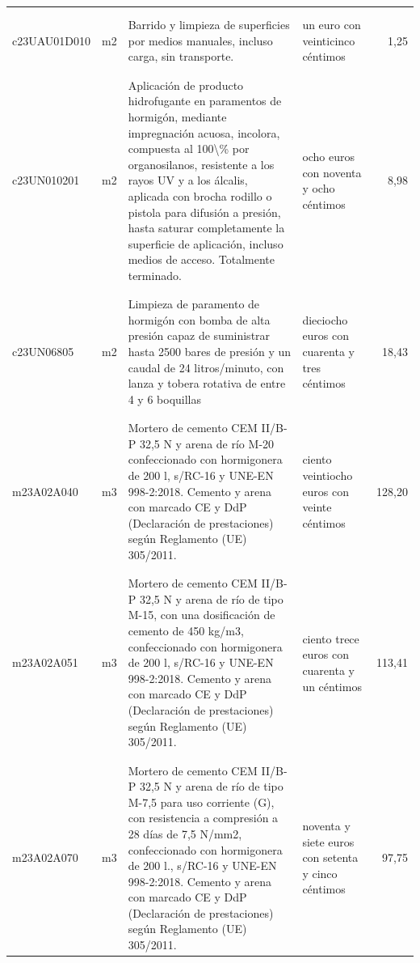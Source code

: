 \documentclass{book}%
\begin{document}
\begin{supertabular}{|l|l|p{5cm}|p{3cm}|r|}
&&&&\\%
&&&&\\%
c23UAU01D010&m2&Barrido y limpieza de superficies por medios manuales, incluso carga, sin transporte.&un euro con veinticinco céntimos&1,25\\%
&&&&\\%
&&&&\\%
c23UN010201&m2&Aplicación de producto hidrofugante en paramentos de hormigón, mediante impregnación acuosa, incolora, compuesta al 100\textbackslash{}\% por organosilanos, resistente a los rayos UV y a los álcalis, aplicada con brocha rodillo o pistola para difusión a presión, hasta saturar completamente la superficie de aplicación, incluso medios de acceso. Totalmente terminado.&ocho euros con noventa y ocho céntimos&8,98\\%
&&&&\\%
&&&&\\%
c23UN06805&m2&Limpieza de paramento de hormigón con bomba de alta presión capaz de suministrar hasta 2500 bares de presión y un caudal de 24 litros/minuto, con lanza y tobera rotativa de entre 4 y 6 boquillas&dieciocho euros con cuarenta y tres céntimos&18,43\\%
&&&&\\%
&&&&\\%
m23A02A040&m3&Mortero de cemento CEM II/B{-}P 32,5 N y arena de río M{-}20 confeccionado con hormigonera de 200 l, s/RC{-}16 y UNE{-}EN 998{-}2:2018. Cemento y arena con marcado CE y DdP (Declaración de prestaciones) según Reglamento (UE) 305/2011.&ciento veintiocho euros con veinte céntimos&128,20\\%
&&&&\\%
&&&&\\%
m23A02A051&m3&Mortero de cemento CEM II/B{-}P 32,5 N y arena de río de tipo M{-}15, con una dosificación de cemento de 450 kg/m3, confeccionado con hormigonera de 200 l, s/RC{-}16 y UNE{-}EN 998{-}2:2018. Cemento y arena con marcado CE y DdP (Declaración de prestaciones) según Reglamento (UE) 305/2011.&ciento trece euros con cuarenta y un céntimos&113,41\\%
&&&&\\%
&&&&\\%
m23A02A070&m3&Mortero de cemento CEM II/B{-}P 32,5 N y arena de río de tipo M{-}7,5 para uso corriente (G), con resistencia a compresión a 28 días de 7,5 N/mm2, confeccionado con hormigonera de 200 l., s/RC{-}16 y UNE{-}EN 998{-}2:2018. Cemento y arena con marcado CE y DdP (Declaración de prestaciones) según Reglamento (UE) 305/2011.&noventa y siete euros con setenta y cinco céntimos&97,75\\%

\end{supertabular}
\end{document}
